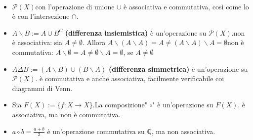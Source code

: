 \documentclass[../main.tex]{subfiles}
\begin{document}
\begin{example}
    \
    \begin{itemize}
        \item $\mathcal{P}(X) $con l'operazione di unione $\cup$ è associativa e commutativa, così come lo è con
              l'intersezione $ \cap $.
        \item $A \backslash B  := A \cup B^C$ \textbf{(differenza insiemistica)} è un'operazione su
              $\mathcal{P}(X)$.\newline non è associativa: sia $A \neq \emptyset.$ Allora $A \backslash (A \backslash A)
                  = A \neq (A\backslash A) \backslash A = \emptyset$\newline non è commutativa: $A \backslash \emptyset
                  = A \neq \emptyset \backslash A = \emptyset$, se $A \neq \emptyset$
        \item $A \Delta B := (A \backslash B) \cup (B \backslash A)$ \textbf{(differenza simmetrica)}
              è un'operazione su $\mathcal{P}(X)$. \newline è commutativa e anche associativa, facilmente verificabile
              coi diagrammi di Venn.
        \item Sia $F(X) := \{f : X\rightarrow X\}$.\newline La composizione" $\circ$" è un'operazione su $F(X)$.
              \newline è associativa, ma non è commutativa.
        \item $a \circ b = \frac{a + b}{2} $ è un'operazione commutativa su $\mathbb{Q}$, ma non associativa.
    \end{itemize}
\end{example}
\end{document}
